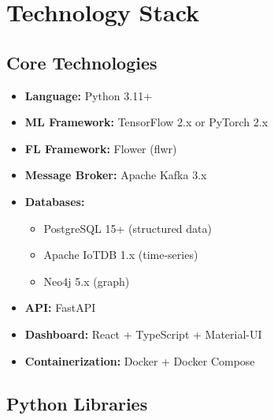 \documentclass[12pt,a4paper]{article}
\begin{document}
\section{Technology Stack}

\subsection{Core Technologies}

\begin{itemize}[leftmargin=1cm,itemsep=0pt]
    \item \textbf{Language:} Python 3.11+
    \item \textbf{ML Framework:} TensorFlow 2.x or PyTorch 2.x
    \item \textbf{FL Framework:} Flower (flwr)
    \item \textbf{Message Broker:} Apache Kafka 3.x
    \item \textbf{Databases:}
    \begin{itemize}
        \item PostgreSQL 15+ (structured data)
        \item Apache IoTDB 1.x (time-series)
        \item Neo4j 5.x (graph)
    \end{itemize}
    \item \textbf{API:} FastAPI
    \item \textbf{Dashboard:} React + TypeScript + Material-UI
    \item \textbf{Containerization:} Docker + Docker Compose
\end{itemize}

\subsection{Python Libraries}
\end{document}
